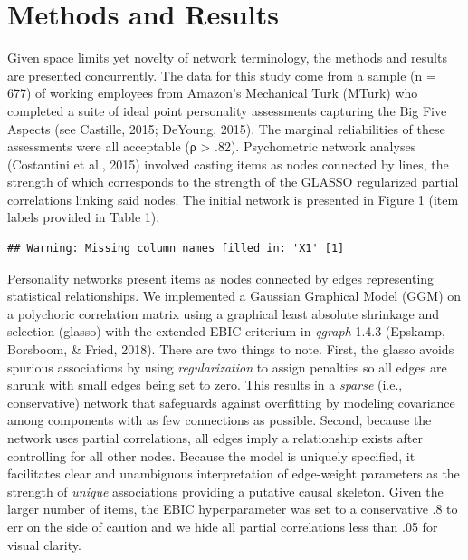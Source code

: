 \documentclass[man]{apa6}
\begin{document}
\section{Methods and Results}\label{methods-and-results}

Given space limits yet novelty of network terminology, the methods and
results are presented concurrently. The data for this study come from a
sample (n = 677) of working employees from Amazon's Mechanical Turk
(MTurk) who completed a suite of ideal point personality assessments
capturing the Big Five Aspects (see Castille, 2015; DeYoung, 2015). The
marginal reliabilities of these assessments were all acceptable (ρ
\textgreater{} .82). Psychometric network analyses (Costantini et al.,
2015) involved casting items as nodes connected by lines, the strength
of which corresponds to the strength of the GLASSO regularized partial
correlations linking said nodes. The initial network is presented in
Figure 1 (item labels provided in Table 1).

\begin{verbatim}
## Warning: Missing column names filled in: 'X1' [1]
\end{verbatim}

Personality networks present items as nodes connected by edges
representing statistical relationships. We implemented a Gaussian
Graphical Model (GGM) on a polychoric correlation matrix using a
graphical least absolute shrinkage and selection (glasso) with the
extended EBIC criterium in \emph{qgraph} 1.4.3 (Epskamp, Borsboom, \&
Fried, 2018). There are two things to note. First, the glasso avoids
spurious associations by using \emph{regularization} to assign penalties
so all edges are shrunk with small edges being set to zero. This results
in a \emph{sparse} (i.e., conservative) network that safeguards against
overfitting by modeling covariance among components with as few
connections as possible. Second, because the network uses partial
correlations, all edges imply a relationship exists after controlling
for all other nodes. Because the model is uniquely specified, it
facilitates clear and unambiguous interpretation of edge-weight
parameters as the strength of \emph{unique} associations providing a
putative causal skeleton. Given the larger number of items, the EBIC
hyperparameter was set to a conservative .8 to err on the side of
caution and we hide all partial correlations less than .05 for visual
clarity.
\end{document}

